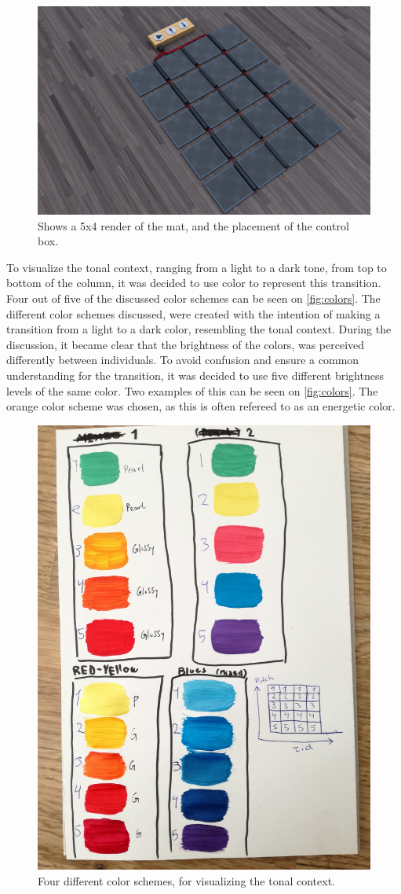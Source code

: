 \begin{figure}[H]
	\centering
	\includegraphics[width=0.8\linewidth]{figure/Design/finaldesign}
	\caption{Shows a 5x4 render of the mat, and the placement of the control box.}
	\label{fig:matSize}
\end{figure}

To visualize the tonal context, ranging from a light to a dark tone, from top to bottom of the column, it was decided to use color to represent this transition. Four out of five of the discussed color schemes can be seen on \autoref{fig:colors}. The different color schemes discussed, were created with the intention of making a transition from a light to a dark color, resembling the tonal context. During the discussion, it became clear that the brightness of the colors, was perceived differently between individuals. To avoid confusion and ensure a common understanding for the transition, it was decided to use five different brightness levels of the same color. Two examples of this can be seen on \autoref{fig:colors}. The orange color scheme was chosen, as this is often refereed to as an energetic color\cite{orange}.

\begin{figure}[H]
	\centering
	\includegraphics[width=0.5\linewidth]{figure/Design/colors}
	\caption{Four different color schemes, for visualizing the tonal context.}	
	\label{fig:colors}
\end{figure}

